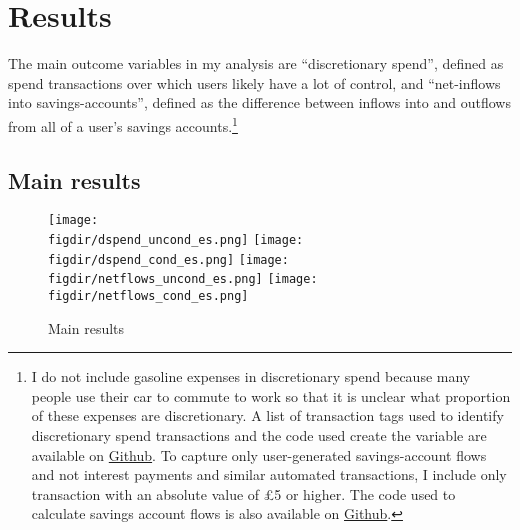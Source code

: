 
\section{Results}%
\label{sec:results}

The main outcome variables in my analysis are ``discretionary spend'', defined
as spend transactions over which users likely have a lot of control, and
``net-inflows into savings-accounts'', defined as the difference between
inflows into and outflows from all of a user's savings accounts.\footnote{I do
    not include gasoline expenses in discretionary spend because many people
    use their car to commute to work so that it is unclear what proportion of
    these expenses are discretionary. A list of transaction tags used to
    identify discretionary spend transactions and the code used create the
    variable are available on
    \href{https://github.com/fabiangunzinger/mdb_eval/blob/f31bfcd7a330188cdd27968d41957ebf5b454099/src/data/aggregators.py\#L389}{Github}.
    To capture only user-generated savings-account flows and not interest
    payments and similar automated transactions, I include only transaction
with an absolute value of \pounds5 or higher. The code used to calculate
savings account flows is also available on
\href{https://github.com/fabiangunzinger/mdb_eval/blobf31bfcd7a330188cdd27968d41957ebf5b454099/src/data/aggregators.py\#L89}{Github}.}


\subsection{Main results}%
\label{sub:main_results}

\begin{figure}[h]
    \centering 
    \caption{Main results}
    \label{fig:main_results}
    \texttt{[image: \\figdir/dspend\_uncond\_es.png]}
    \texttt{[image: \\figdir/dspend\_cond\_es.png]}
    \texttt{[image: \\figdir/netflows\_uncond\_es.png]}
    \texttt{[image: \\figdir/netflows\_cond\_es.png]}
\end{figure}

